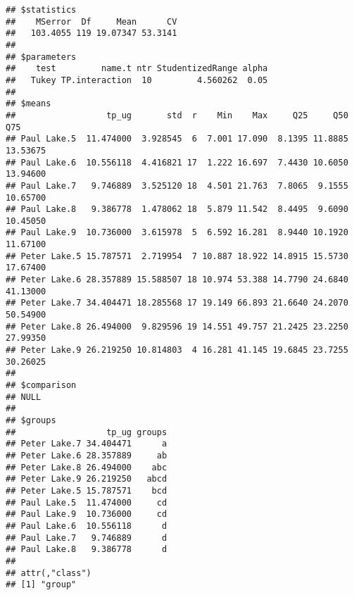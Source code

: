 \documentclass[]{article}
\newenvironment{Shaded}{\begin{snugshade}}{\end{snugshade}}
\newcommand{\KeywordTok}[1]{\textcolor[rgb]{0.13,0.29,0.53}{\textbf{#1}}}
\newcommand{\DataTypeTok}[1]{\textcolor[rgb]{0.13,0.29,0.53}{#1}}
\newcommand{\StringTok}[1]{\textcolor[rgb]{0.31,0.60,0.02}{#1}}
\newcommand{\CommentTok}[1]{\textcolor[rgb]{0.56,0.35,0.01}{\textit{#1}}}
\newcommand{\OtherTok}[1]{\textcolor[rgb]{0.56,0.35,0.01}{#1}}
\newcommand{\OperatorTok}[1]{\textcolor[rgb]{0.81,0.36,0.00}{\textbf{#1}}}
\newcommand{\NormalTok}[1]{#1}
\begin{document}
\begin{Shaded}
\end{Shaded}

\begin{verbatim}
## $statistics
##    MSerror  Df     Mean      CV
##   103.4055 119 19.07347 53.3141
## 
## $parameters
##    test         name.t ntr StudentizedRange alpha
##   Tukey TP.interaction  10         4.560262  0.05
## 
## $means
##                  tp_ug       std  r    Min    Max     Q25     Q50      Q75
## Paul Lake.5  11.474000  3.928545  6  7.001 17.090  8.1395 11.8885 13.53675
## Paul Lake.6  10.556118  4.416821 17  1.222 16.697  7.4430 10.6050 13.94600
## Paul Lake.7   9.746889  3.525120 18  4.501 21.763  7.8065  9.1555 10.65700
## Paul Lake.8   9.386778  1.478062 18  5.879 11.542  8.4495  9.6090 10.45050
## Paul Lake.9  10.736000  3.615978  5  6.592 16.281  8.9440 10.1920 11.67100
## Peter Lake.5 15.787571  2.719954  7 10.887 18.922 14.8915 15.5730 17.67400
## Peter Lake.6 28.357889 15.588507 18 10.974 53.388 14.7790 24.6840 41.13000
## Peter Lake.7 34.404471 18.285568 17 19.149 66.893 21.6640 24.2070 50.54900
## Peter Lake.8 26.494000  9.829596 19 14.551 49.757 21.2425 23.2250 27.99350
## Peter Lake.9 26.219250 10.814803  4 16.281 41.145 19.6845 23.7255 30.26025
## 
## $comparison
## NULL
## 
## $groups
##                  tp_ug groups
## Peter Lake.7 34.404471      a
## Peter Lake.6 28.357889     ab
## Peter Lake.8 26.494000    abc
## Peter Lake.9 26.219250   abcd
## Peter Lake.5 15.787571    bcd
## Paul Lake.5  11.474000     cd
## Paul Lake.9  10.736000     cd
## Paul Lake.6  10.556118      d
## Paul Lake.7   9.746889      d
## Paul Lake.8   9.386778      d
## 
## attr(,"class")
## [1] "group"
\end{verbatim}
\end{document}
